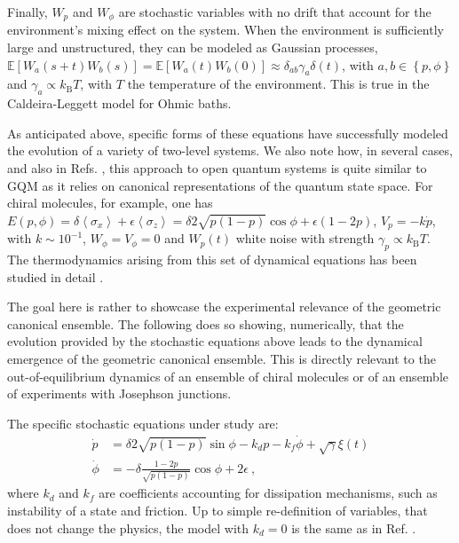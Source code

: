 \documentclass[draft,nofootinbib,pre,twocolumn,showpacs,showkeys,groupaddress,preprintnumbers,floatfix]{revtex4-1}
\newcommand{\kB}{k_\text{B}}
\newcommand{\1}{\mathbbm{1}}
\newcommand{\MV}[1]{\left\langle #1 \right\rangle}
\begin{document}
Finally, $W_p$ and $W_{\phi}$ are stochastic variables with no drift that
account for the environment's mixing effect on the system. When the
environment is sufficiently large and unstructured, they can be modeled as
Gaussian processes, $\mathbb{E}[W_a(s+t)W_b(s)]=\mathbb{E}[W_a(t)W_b(0)]
\approx \delta_{ab} \gamma_a \delta(t)$, with $a,b \in \left\{ p,\phi\right\}$
and $\gamma_a \propto \kB T$, with $T$ the temperature of the environment.
This is true in the Caldeira-Leggett model for Ohmic baths.

As anticipated above, specific forms of these equations have successfully
modeled the evolution of a variety of two-level systems. We also note how, in
several cases, and also in Refs. \cite{Mill78,Mey79,Kostin72,Stock97,Chru04},
this approach to open quantum systems is quite similar to GQM as it relies on
canonical representations of the quantum state space. For chiral molecules,
for example, one has $E(p,\phi)=\delta \MV{\sigma_x} + \epsilon
\MV{\sigma_z}=\delta 2 \sqrt{p(1-p)}\cos \phi + \epsilon (1-2p)$, $V_p = - k
\dot{p}$, with $k \sim 10^{-1}$, $W_\phi=V_\phi=0$ and $W_p(t)$ white noise
with strength $\gamma_p \propto \kB T$. The thermodynamics arising from this
set of dynamical equations has been studied in detail
\cite{Urra12,Barg11,Rod14,Rod13,Barg13,Barg14,Katz16}. 

The goal here is rather to showcase the experimental relevance of the
geometric canonical ensemble. The following does so showing, numerically, that
the evolution provided by the stochastic equations above leads to the
dynamical emergence of the geometric canonical ensemble. This is directly
relevant to the out-of-equilibrium dynamics of an ensemble of chiral molecules
or of an ensemble of experiments with Josephson junctions.

The specific stochastic equations under study are:
\begin{align}
\dot{p} & =  \delta 2 \sqrt{p(1-p)} \sin \phi - k_d p - k_f \dot{\phi}
  + \sqrt{\gamma} \xi(t) \label{eq:stoch_model} \\
\dot{\phi} & =  -\delta \frac{1-2p}{\sqrt{p(1-p)}} \cos \phi
  + 2\epsilon
  \nonumber 
  ~,
\end{align}
where $k_d$ and $k_f$ are coefficients accounting for dissipation mechanisms,
such as instability of a state and friction. Up to simple re-definition of
variables, that does not change the physics, the model with $k_d=0$ is the
same as in Ref. \cite{Rod14,Rod13}.
\end{document}
